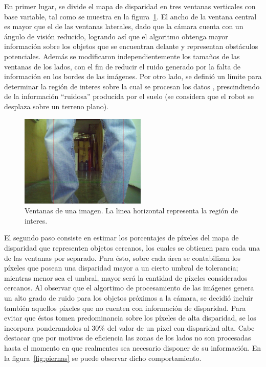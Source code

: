 \documentclass[journal]{IEEEtran}
\begin{document}
En primer lugar, se divide el mapa de disparidad en tres ventanas verticales con base variable, tal como se muestra en la figura~\ref{fig:piernas_cerca}. El ancho de la ventana central es mayor que el de las ventanas laterales, dado que la c\'amara cuenta con un \'angulo de visi\'on reducido, logrando as\'i que el algoritmo obtenga mayor informaci\'on sobre los objetos que se encuentran delante y representan obst\'aculos potenciales. Adem\'as se modificaron independientemente los tama\~nos de las ventanas de los lados, con el fin de reducir el ruido generado por la falta de informaci\'on en los bordes de las im\'agenes. Por otro lado, se defini\'o un l\'imite para determinar la regi\'on de interes sobre la cual se procesan los datos \cite{H09}, prescindiendo de la informaci\'on ``ruidosa'' producida por el suelo (se considera que el robot se desplaza sobre un terreno plano).

\begin{figure}[ht]
	\begin{center}
		\includegraphics[width=6cm]{./images/piernas_cerca.jpg}
	\end{center}
	\caption{Ventanas de una imagen. La linea horizontal representa la regi\'on de interes.}
	\label{fig:piernas_cerca}
\end{figure}

El segundo paso consiste en estimar los porcentajes de p\'ixeles del mapa de disparidad que representen objetos cercanos, los cuales se obtienen para cada una de las ventanas por separado. Para \'esto, sobre cada \'area se contabilizan los p\'ixeles que posean una disparidad mayor a un cierto umbral de tolerancia; mientras menor sea el umbral, mayor ser\'a la cantidad de p\'ixeles considerados cercanos. Al observar que el algortimo de procesamiento de las im\'agenes genera un alto grado de ruido para los objetos pr\'oximos a la c\'amara, se decidi\'o incluir tambi\'en aquellos p\'ixeles que no cuenten con informaci\'on de disparidad. Para evitar que \'estos tomen predominancia sobre los p\'ixeles de alta disparidad, se los incorpora ponderandolos al $30\%$ del valor de un p\'ixel con disparidad alta. Cabe destacar que por motivos de eficiencia las zonas de los lados no son procesadas hasta el momento en que realmentes sea necesario disponer de su informaci\'on. En la figura~\ref{fig:piernas} se puede observar dicho comportamiento.
\end{document}
